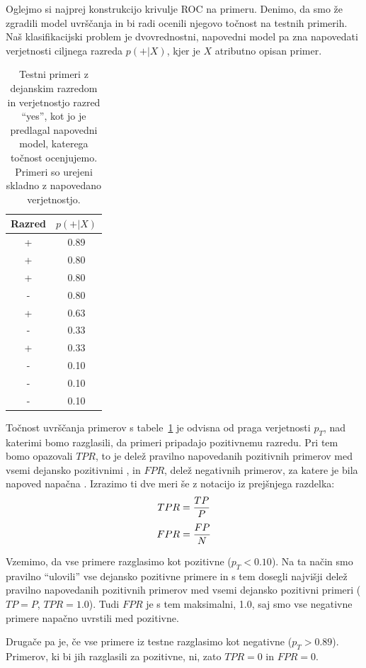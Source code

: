 Oglejmo si najprej konstrukcijo krivulje ROC na primeru. Denimo, da smo že zgradili model uvrščanja in bi radi ocenili njegovo točnost na testnih primerih. Naš klasifikacijski problem je dvovrednostni, napovedni model pa zna napovedati verjetnosti ciljnega razreda $p(+|X)$, kjer je $X$ atributno opisan primer.

\begin{table}[htbp]
\caption{Testni primeri z dejanskim razredom in verjetnostjo razred ``yes'', kot jo je predlagal napovedni model, katerega točnost ocenjujemo. Primeri so urejeni skladno z napovedano verjetnostjo.}
\label{t-auc}
\begin{center}
\begin{tabular}{cc}
\toprule
Razred & $p(+|X)$ \\
\midrule
+ & 0.89 \\
+ & 0.80 \\
+ & 0.80 \\
- & 0.80 \\
+ & 0.63 \\
- & 0.33 \\
+ & 0.33 \\
- & 0.10 \\
- & 0.10 \\
- & 0.10 \\
\bottomrule
\end{tabular}
\end{center}
\end{table}

Točnost uvrščanja primerov s tabele~\ref{t-auc} je odvisna od praga verjetnosti $p_T$, nad katerimi bomo razglasili, da primeri pripadajo pozitivnemu razredu. Pri tem bomo opazovali $TPR$, to je delež pravilno napovedanih pozitivnih primerov med vsemi dejansko pozitivnimi , in $FPR$, delež negativnih primerov, za katere je bila napoved napačna . Izrazimo ti dve meri še z notacijo iz prejšnjega razdelka:
$$ TPR = {TP \over P} $$
$$ FPR = {FP \over N} $$

Vzemimo, da vse primere razglasimo kot pozitivne ($p_T<0.10$). Na ta način smo pravilno ``ulovili'' vse dejansko pozitivne primere in s tem dosegli najvišji delež pravilno napovedanih pozitivnih primerov med vsemi dejansko pozitivni primeri ($TP=P$, $TPR=1.0$). Tudi $FPR$ je s tem maksimalni, 1.0, saj smo vse negativne primere napačno uvrstili med pozitivne.

Drugače pa je, če vse primere iz testne razglasimo kot negativne ($p_T>0.89$). Primerov, ki bi jih razglasili za pozitivne, ni, zato $TPR=0$ in $FPR=0$.

